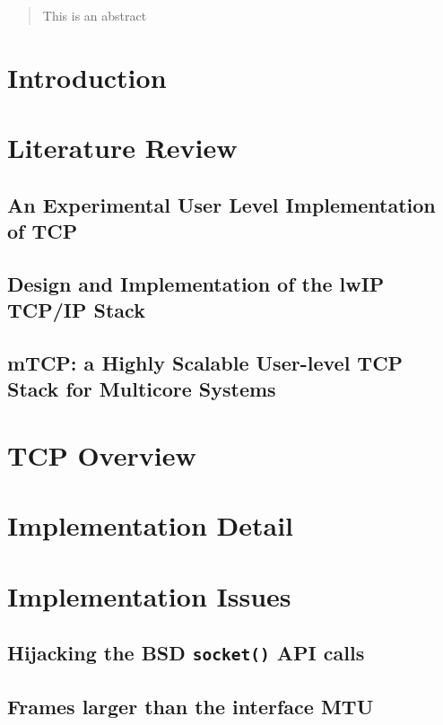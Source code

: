 \documentclass[10pt,a4paper,british]{article}
\begin{document}
\begin{abstract}
This is an abstract
\end{abstract}

\tableofcontents

\section{Introduction}

\section{Literature Review}
\subsection{An Experimental User Level Implementation of TCP~\cite{braun:inria-00074040}}
\subsection{Design and Implementation of the lwIP TCP/IP Stack~\cite{lwip}}
\subsection{mTCP: a Highly Scalable User-level TCP Stack for Multicore Systems} %
\cite{jeong2014mtcp} %

\section{TCP Overview}

\section{Implementation Detail}

\section{Implementation Issues}
\subsection{Hijacking the BSD \texttt{socket()} API calls} %
% 

\subsection{Frames larger than the interface MTU}
\end{document}
